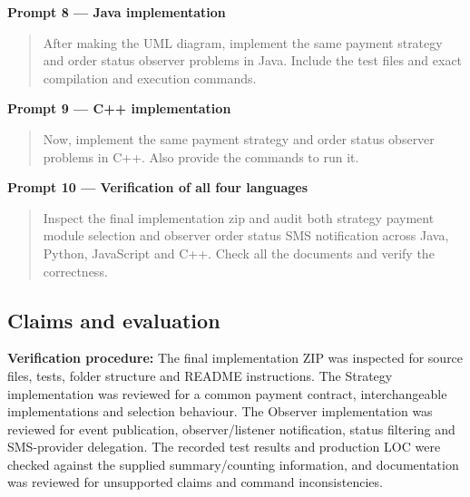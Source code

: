 \documentclass[11pt,a4paper]{article}
\begin{document}
\textbf{Prompt 8 --- Java implementation}
\begin{quote}\small
After making the UML diagram, implement the same payment strategy and order status observer problems in Java. Include the test files and exact compilation and execution commands.
\end{quote}

\textbf{Prompt 9 --- C++ implementation}
\begin{quote}\small
Now, implement the same payment strategy and order status observer problems in C++. Also provide the commands to run it.
\end{quote}

\textbf{Prompt 10 --- Verification of all four languages}
\begin{quote}\small
Inspect the final implementation zip and audit both strategy payment module selection and observer order status SMS notification across Java, Python, JavaScript and C++. Check all the documents and verify the correctness.
\end{quote}

\subsection*{Claims and evaluation}

\textbf{Verification procedure:} The final implementation ZIP was inspected for source files, tests, folder structure and README instructions. The Strategy implementation was reviewed for a common payment contract, interchangeable implementations and selection behaviour. The Observer implementation was reviewed for event publication, observer/listener notification, status filtering and SMS-provider delegation. The recorded test results and production LOC were checked against the supplied summary/counting information, and documentation was reviewed for unsupported claims and command inconsistencies.
\end{document}

